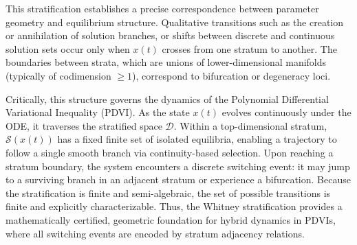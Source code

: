 \documentclass[sn-basic,Numbered]{sn-jnl}
\theoremstyle{thmstyleone}%
\begin{document}
This stratification establishes a precise correspondence between parameter geometry and equilibrium structure. Qualitative transitions such as the creation or annihilation of solution branches, or shifts between discrete and continuous solution sets occur only when $x(t)$ crosses from one stratum to another. The boundaries between strata, which are unions of lower-dimensional manifolds (typically of codimension $\geq 1$), correspond to bifurcation or degeneracy loci.

Critically, this structure governs the dynamics of the Polynomial Differential Variational Inequality (PDVI). As the state $x(t)$ evolves continuously under the ODE, it traverses the stratified space $\mathcal{D}$. Within a top-dimensional stratum, $\mathcal{S}(x(t))$ has a fixed finite set of isolated equilibria, enabling a trajectory to follow a single smooth branch via continuity-based selection. Upon reaching a stratum boundary, the system encounters a discrete switching event: it may jump to a surviving branch in an adjacent stratum or experience a bifurcation. Because the stratification is finite and semi-algebraic, the set of possible transitions is finite and explicitly characterizable. Thus, the Whitney stratification provides a mathematically certified, geometric foundation for hybrid dynamics in PDVIs, where all switching events are encoded by stratum adjacency relations.
\end{document}
